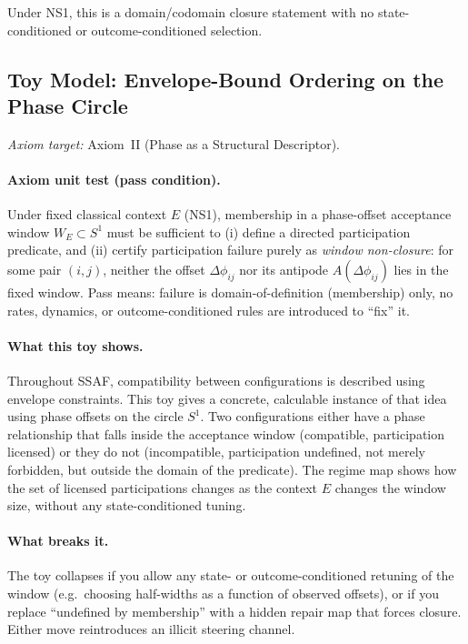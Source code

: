 \documentclass[aps,prx,onecolumn,11pt]{revtex4-2}
\theoremstyle{plain}
\theoremstyle{definition}
\theoremstyle{remark}
\begin{document}
Under NS1, this is a domain/codomain closure statement with no
state-conditioned or outcome-conditioned selection.

\subsection{Toy Model: Envelope-Bound Ordering on the Phase Circle}
\label{toy:envelope_ordering}

\noindent\emph{Axiom target:} Axiom~II (Phase as a Structural Descriptor).

\paragraph{Axiom unit test (pass condition).}
Under fixed classical context $E$ (NS1), membership in a phase-offset
acceptance window $W_E \subset S^1$ must be sufficient to (i) define
a directed participation predicate, and (ii) certify participation
failure purely as \emph{window non-closure}: for some pair $(i,j)$,
neither the offset $\Delta\phi_{ij}$ nor its antipode
$A(\Delta\phi_{ij})$ lies in the fixed window. Pass means: failure is
domain-of-definition (membership) only, no rates, dynamics, or
outcome-conditioned rules are introduced to ``fix'' it.

\paragraph{What this toy shows.}
Throughout SSAF, compatibility between configurations is described
using envelope constraints. This toy gives a concrete, calculable
instance of that idea using phase offsets on the circle $S^1$. Two
configurations either have a phase relationship that falls inside the
acceptance window (compatible, participation licensed) or they do not
(incompatible, participation undefined, not merely forbidden, but
outside the domain of the predicate). The regime map shows how the
set of licensed participations changes as the context $E$ changes the
window size, without any state-conditioned tuning.

\paragraph{What breaks it.}
The toy collapses if you allow any state- or outcome-conditioned
retuning of the window (e.g.\ choosing half-widths as a function of
observed offsets), or if you replace ``undefined by membership'' with
a hidden repair map that forces closure. Either move reintroduces an
illicit steering channel.
\end{document}
